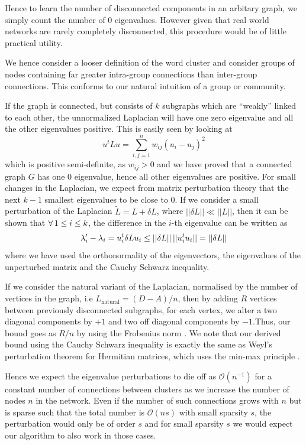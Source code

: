 \documentclass{article}
\begin{document}
Hence to learn the number of disconnected components in an arbitary graph, we simply count the number of $0$ eigenvalues. However given that real world networks are rarely completely disconnected, this procedure would be of little practical utility. 


We hence consider a looser definition of the word cluster and consider groups of nodes containing far greater intra-group connections than inter-group connections. This conforms to our natural intuition of a group or community.  

If the graph is connected, but consists of $k$ subgraphs which are ``weakly'' linked to each other, the unnormalized Laplacian will have one zero eigenvalue and all the other eigenvalues positive. This is easily seen by looking at
\begin{equation}
u^{t}Lu = \sum_{i,j=1}^{n}w_{ij}(u_{i}-u_{j})^{2}
\end{equation}
which is positive semi-definite, as $w_{ij}>0$ and we have proved that a connected graph $G$ has one $0$ eigenvalue, hence all other eigenvalues are positive. For small changes in the Laplacian, we expect from matrix perturbation theory \citep{bhatia2013matrix} that the next $k-1$ smallest eigenvalues to be close to $0$. If we consider a small perturbation of the Laplacian $\tilde{L} = L +\delta L$, where $|| \delta L|| \ll ||L||$, then it can be shown that $\forall \thinspace 1\leq i\leq k $, the difference in the $i$-th eigenvalue can be written as 
\begin{equation}
\label{cauchyschwarz}
\lambda_{i}' - \lambda_{i} = u_{i}^{t}\delta L u_{i} \leq ||\delta L||\thinspace||u_{i}^{t}u_{i}|| = ||\delta L||
\end{equation}
where we have used the orthonormality of the eigenvectors, the eigenvalues of the unperturbed matrix and the Cauchy Schwarz inequality. 

If we consider the natural variant of the Laplacian, normalised by the number of vertices in the graph, i.e $L_\mathrm{natural} = (D-A)/n$, then by adding $R$ vertices between previously disconnected subgraphs, for each vertex, we alter a two diagonal components by $+1$ and two off diagonal components by $-1$.Thus, our bound goes as $R/n$ by using the Frobenius norm . We note that our derived bound using the Cauchy Schwarz inequality is exactly the same as Weyl's perturbation theorem for Hermitian matrices, which uses the min-max principle \citep{bhatia2013matrix}.


Hence we expect the eigenvalue perturbations to die off as $\mathcal{O}(n^{-1})$ for a constant number of connections between clusters as we increase the number of nodes $n$ in the network. Even if the number of such connections grows with $n$ but is sparse such that the total number is $\mathcal{O}(n s)$ with small sparsity $s$, the perturbation would only be of order $s$ and for small sparsity $s$ we would expect our algorithm to also work in those cases.
\end{document}
